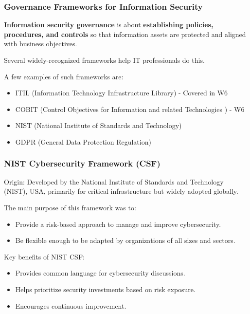 \subsubsection{Governance Frameworks for Information Security}

\indent

\textbf{Information security governance} is about \textbf{establishing policies, procedures, and controls} so that information assets are protected and aligned with business objectives. 

Several widely-recognized frameworks help IT professionals do this.

A few examples of such frameworks are:

\begin{itemize}
    \item ITIL (Information Technology Infrastructure Library) - Covered in W6
    \item COBIT (Control Objectives for Information and related Technologies ) - W6
    \item NIST (National Institute of Standards and Technology)
    \item GDPR (General Data Protection Regulation)
\end{itemize}

\subsubsection{NIST Cybersecurity Framework (CSF)}

\indent

Origin: Developed by the National Institute of Standards and Technology (NIST), USA, primarily for critical infrastructure but widely adopted globally.

The main purpose of this framework was to:

\begin{itemize}
    \item Provide a risk-based approach to manage and improve cybersecurity.
    \item Be flexible enough to be adapted by organizations of all sizes and sectors.
\end{itemize}

Key benefits of NIST CSF:

\begin{itemize}
    \item Provides common language for cybersecurity discussions.
    \item Helps prioritize security investments based on risk exposure.
    \item Encourages continuous improvement.
\end{itemize}

